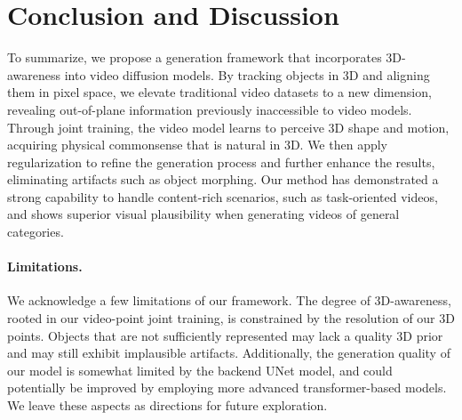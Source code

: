 \section{Conclusion and Discussion}

To summarize, we propose a generation framework that incorporates 3D-awareness into video diffusion models. By tracking objects in 3D and aligning them in pixel space, we elevate traditional video datasets to a new dimension, revealing out-of-plane information previously inaccessible to video models. Through joint training, the video model learns to perceive 3D shape and motion, acquiring physical commonsense that is natural in 3D. We then apply regularization to refine the generation process and further enhance the results, eliminating artifacts such as object morphing. Our method has demonstrated a strong capability to handle content-rich scenarios, such as task-oriented videos, and shows superior visual plausibility when generating videos of general categories.

\paragraph{Limitations.}
We acknowledge a few limitations of our framework. The degree of 3D-awareness, rooted in our video-point joint training, is constrained by the resolution of our 3D points. Objects that are not sufficiently represented may lack a quality 3D prior and may still exhibit implausible artifacts. Additionally, the generation quality of our model is somewhat limited by the backend UNet model, and could potentially be improved by employing more advanced transformer-based models. We leave these aspects as directions for future exploration.